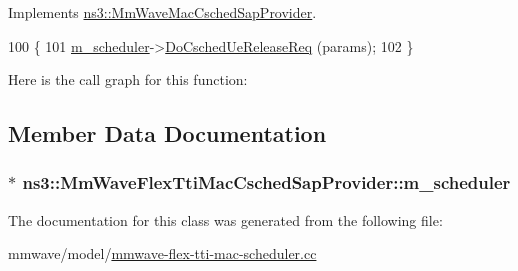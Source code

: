 Implements \hyperlink{classns3_1_1MmWaveMacCschedSapProvider_a71346555e5ecb7fecbf27cf5658c1f0c}{ns3\+::\+Mm\+Wave\+Mac\+Csched\+Sap\+Provider}.


\begin{DoxyCode}
100 \{
101   \hyperlink{classns3_1_1MmWaveFlexTtiMacCschedSapProvider_a3eb24d8f14ad7df6f191e5003fae118a}{m\_scheduler}->\hyperlink{classns3_1_1MmWaveFlexTtiMacScheduler_a39e444a162781be1bd04ad02c39ca378}{DoCschedUeReleaseReq} (params);
102 \}
\end{DoxyCode}


Here is the call graph for this function\+:




\subsection{Member Data Documentation}
\subsubsection[{\texorpdfstring{m\+\_\+scheduler}{m_scheduler}}]{$\ast$ ns3\+::\+Mm\+Wave\+Flex\+Tti\+Mac\+Csched\+Sap\+Provider\+::m\+\_\+scheduler\hspace{0.3cm}{\ttfamily [private]}}\hypertarget{classns3_1_1MmWaveFlexTtiMacCschedSapProvider_a3eb24d8f14ad7df6f191e5003fae118a}{}\label{classns3_1_1MmWaveFlexTtiMacCschedSapProvider_a3eb24d8f14ad7df6f191e5003fae118a}


The documentation for this class was generated from the following file\+:\begin{DoxyCompactItemize}
\item 
mmwave/model/\hyperlink{mmwave-flex-tti-mac-scheduler_8cc}{mmwave-\/flex-\/tti-\/mac-\/scheduler.\+cc}\end{DoxyCompactItemize}
